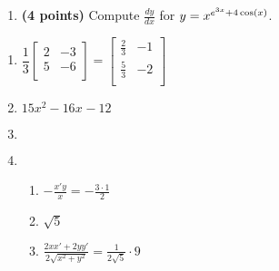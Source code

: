 \documentclass[12pt]{amsart}
\begin{document}
\begin{enumerate}[resume]
\item {\bf (4 points)} 
 Compute $\frac{dy}{dx}$ for $y=x^{e^{3 x} +4 \cos(x)}$.

\vfill 
 \end{enumerate}\newpage\newpage{}\graphicspath{{C:/Users/iainc/anaconda3/Randomizer/MATH 1001/Midterm 1/}}\begin{enumerate}\def \a{-6}\def \b{3}\def \c{-5}\def \d{2}\def \negb{-3}\def \negc{5}\def \determ{3}\def \ansa{\frac{2}{3}}\def \ansb{-1}\def \ansc{\frac{5}{3}}\def \ansd{-2}
\item $\dfrac{1}{\determ} \left[ \begin{array}{cc}
\d & \negb \\
\negc & \a \\ \end{array} \right] = 
\left[ \begin{array}{cc}
\ansa & \ansb \\
\ansc & \ansd \\ \end{array} \right]$
\def \a{5}\def \athree{15}\def \b{-8}\def \btwo{-16}\def \c{-12}\def \d{7}\def \poly{5x^{3}-8x^{2}-12x^{}+7}\def \polydif{15x^{2}-16x^{}-12}
\item $\polydif$
\def \a{-4}\def \b{1}\def \c{4}\def \shift{-1}\def \upside{1}\def \discr{196}\def \highone{-2.0}\def \hightwo{2.6666666666666665}\def \scale{36.0}\def \scalef{0.10555555555555556}\def \difb{2}\def \difc{-16}
\item $ $ 

\def \b{4}\def \x{2}\def \y{1}\def \xchange{3}\def \ratrhs{2}\def \cirrhs{8}\def \hyprhs{0}\def \compy{4y^{2}}\def \ychangenum{3}\def \dist{5}\def \fracrat{9}\def \fraccirc{9}\def \frachyp{15}
\item \begin{enumerate}
\item $-\frac{x'y}{x} = -\frac{\xchange \cdot \y}{\x}$
\item $\sqrt{\dist}$
\item $\frac{2xx'+2yy'}{2\sqrt{x^2+y^2}} = \frac{1}{2\sqrt{\dist}} \cdot \fracrat$
\end{enumerate}


\end{enumerate}
\end{document}
